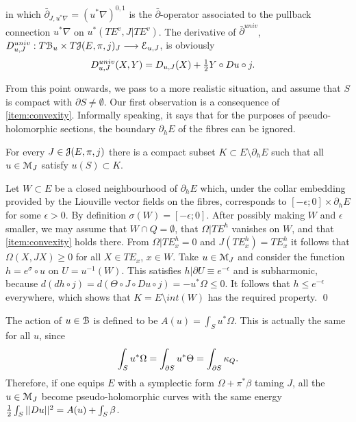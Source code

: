 \documentclass[10pt,letterpaper]{article}
\begin{document}
in which $\bar{\partial}_{J,u^*\nabla} = (u^*\nabla)^{0,1}$ is the
$\bar\partial$-operator associated to the pullback connection $u^*\nabla$ on
$u^*(TE^v,J|TE^v)$. The derivative of $\bar\partial^{univ}$, $D^{univ}_{u,J} :
T\mathcal{B}_u \times T\mathcal{J}(E,\pi,j)_J \longrightarrow \mathcal{E}_{u,J}$, is obviously
\begin{equation} \label{eq:universal-operator}
\begin{split}
 & D^{univ}_{u,J}(X,Y) = D_{u,J}(X) + {\textstyle\frac{1}{2}} Y \circ Du \circ j.
\end{split}
\end{equation}

From this point onwards, we pass to a more realistic situation, and assume that
$S$ is compact with $\partial S \neq \emptyset$. Our first observation is a
consequence of \ref{item:convexity}. Informally speaking, it says that for the
purposes of pseudo-holomorphic sections, the boundary $\partial_hE$ of the
fibres can be ignored.

\begin{lemma} \label{th:convexity}
For every $J \in \mathcal{J}(E,\pi,j)$ there is a compact subset $K \subset E \setminus
\partial_hE$ such that all $u \in \mathcal{M}_J$ satisfy $u(S) \subset K$.
\end{lemma}

\proof Let $W \subset E$ be a closed neighbourhood of $\partial_hE$ which,
under the collar embedding provided by the Liouville vector fields on the
fibres, corresponds to $[-\epsilon;0] \times \partial_hE$ for some
$\epsilon>0$. By definition $\sigma(W) = [-\epsilon;0]$. After possibly making
$W$ and $\epsilon$ smaller, we may assume that $W \cap Q = \emptyset$, that
$\Omega|TE^h$ vanishes on $W$, and that \ref{item:convexity} holds there. From
$\Omega|TE^h_x = 0$ and $J(TE^h_x) = TE^h_x$ it follows that $\Omega(X,JX) \geq
0$ for all $X \in TE_x$, $x \in W$. Take $u \in \mathcal{M}_J$ and consider the
function $h = e^\sigma \circ u$ on $U = u^{-1}(W)$. This satisfies $h|\partial
U \equiv e^{-\epsilon}$ and is subharmonic, because $d(dh \circ j) = d(\Theta
\circ J \circ Du \circ j) = -u^*\Omega \leq 0$. It follows that $h \leq
e^{-\epsilon}$ everywhere, which shows that $K = E \setminus int(W)$ has the
required property. \qed

The action of $u \in \mathcal{B}$ is defined to be $A(u) = \int_S u^*\Omega$. This is
actually the same for all $u$, since
\begin{equation} \label{eq:action}
\int_S u^*\Omega = \int_{\partial S} u^*\Theta = \int_{\partial S} \kappa_Q.
\end{equation}
Therefore, if one equips $E$ with a symplectic form $\Omega + \pi^*\beta$
taming $J$, all the $u \in \mathcal{M}_J$ become pseudo-holomorphic curves with the
same energy ${\textstyle\frac{1}{2}} \int_S ||Du||^2 = A(u) + \int_S \beta$.
\end{document}
